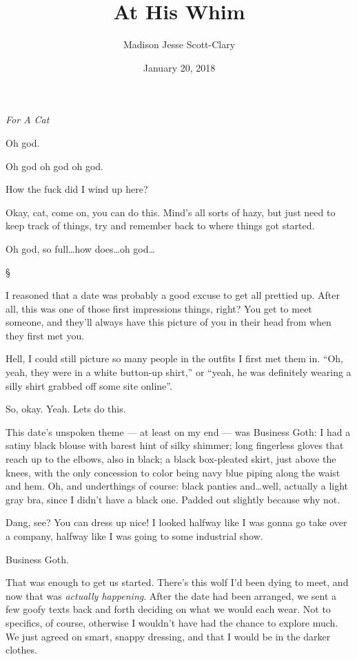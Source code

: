\documentclass[12pt,letterpaper,oneside]{memoir}
\title{At His Whim}
\author{Madison Jesse Scott-Clary}
\date{January 20, 2018}
\newcommand\secdiv{
  \begin{center}
    \S
  \end{center}
}
\begin{document}
  \maketitle
  \begin{center}
    \emph{For A Cat}
  \end{center}

  \vspace{1cm}

  Oh god.

  Oh god oh god oh god.

  How the fuck did I wind up here?

  Okay, cat, come on, you can do this. Mind's all sorts of hazy, but just need to keep track of things, try and remember back to where things got started.

  Oh god, so full\ldots{}how does\ldots{}oh god\ldots{}

  \secdiv

  I reasoned that a date was probably a good excuse to get all prettied up. After all, this was one of those first impressions things, right? You get to meet someone, and they'll always have this picture of you in their head from when they first met you.

  Hell, I could still picture so many people in the outfits I first met them in. ``Oh, yeah, they were in a white button-up shirt,'' or ``yeah, he was definitely wearing a silly shirt grabbed off some site online''.

  So, okay. Yeah. Lets do this.

  This date's unspoken theme --- at least on my end --- was Business Goth: I had a satiny black blouse with barest hint of silky shimmer; long fingerless gloves that reach up to the elbows, also in black; a black box-pleated skirt, just above the knees, with the only concession to color being navy blue piping along the waist and hem. Oh, and underthings of course: black panties and\ldots{}well, actually a light gray bra, since I didn't have a black one. Padded out slightly because why not.

  Dang, see? You can dress up nice! I looked halfway like I was gonna go take over a company, halfway like I was going to some industrial show.

  Business Goth.

  That was enough to get us started. There's this wolf I'd been dying to meet, and now that was \emph{actually happening}. After the date had been arranged, we sent a few goofy texts back and forth deciding on what we would each wear. Not to specifics, of course, otherwise I wouldn't have had the chance to explore much. We just agreed on smart, snappy dressing, and that I would be in the darker clothes.
\end{document}
